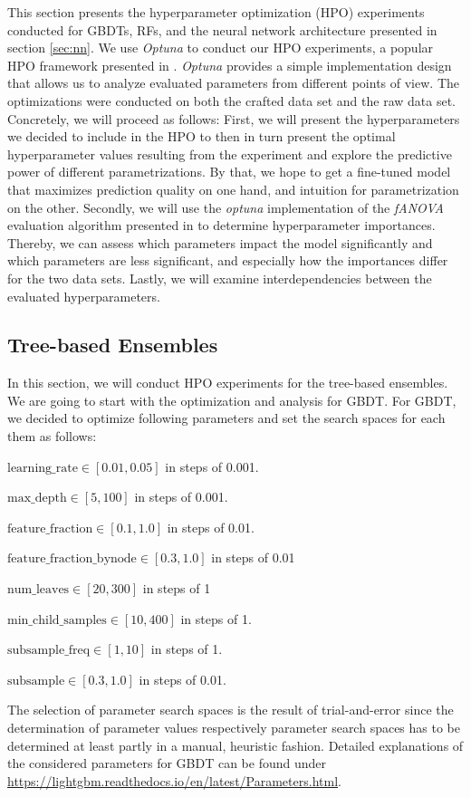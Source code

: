 This section presents the hyperparameter optimization (HPO) experiments conducted for GBDTs, RFs, and the neural network architecture presented in section \ref{sec:nn}. 
We use \textit{Optuna} to conduct our HPO experiments, a popular HPO framework presented in \cite{akiba2019optuna}. \textit{Optuna} provides a simple implementation design that allows us to analyze evaluated parameters from different points of view. 
The optimizations were conducted on both the crafted data set and the raw data set. Concretely, we will proceed as follows: First, we will present the hyperparameters we decided to include in the HPO to then in turn present the optimal hyperparameter values resulting from the experiment and explore the predictive power of different parametrizations. By that, we hope to get a fine-tuned model that maximizes prediction quality on one hand, and intuition for parametrization on the other. Secondly, we will use the \textit{optuna} implementation of the \textit{fANOVA} evaluation algorithm presented in \cite{fANOVA} to determine hyperparameter importances. Thereby, we can assess which parameters impact the model significantly and which parameters are less significant, and especially how the importances differ for the two data sets. Lastly, we will examine interdependencies between the evaluated hyperparameters. 
 
\subsection{Tree-based Ensembles}

In this section, we will conduct HPO experiments for the tree-based ensembles. We are going to start with the optimization and analysis for GBDT.
For GBDT, we decided to optimize following parameters and set the search spaces for each them as follows:
\begin{description}[font=$\bullet$\scshape\bfseries]
	\item $ \text{learning\_rate} \in [0.01, 0.05] $  in steps of 0.001.
	\item $ \text{max\_depth} \in [5, 100] $ in steps of 0.001.
	\item $ \text{feature\_fraction} \in [0.1, 1.0] $ in steps of 0.01.
	\item $ \text{feature\_fraction\_bynode} \in [0.3, 1.0] $ in steps of 0.01
	\item $ \text{num\_leaves} \in [20, 300] $ in steps of 1
	\item $ \text{min\_child\_samples} \in [10, 400] $ in steps of 1.
	\item $ \text{subsample\_freq} \in [1, 10] $ in steps of 1.
	\item $ \text{subsample} \in [0.3, 1.0] $ in steps of 0.01.
\end{description}
The selection of parameter search spaces is the result of trial-and-error since the determination of parameter values respectively parameter search spaces has to be determined at least partly in a manual, heuristic fashion. Detailed explanations of the considered parameters for GBDT can be found under \url{https://lightgbm.readthedocs.io/en/latest/Parameters.html}. 

